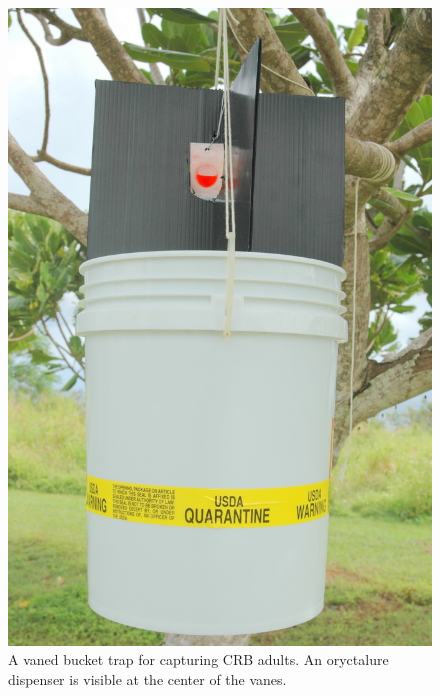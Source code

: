\documentclass[twocolumn,letterpaper]{scrartcl}
\begin{document}
\begin{figure}[h]
	\centering
	\includegraphics[width=0.7\linewidth]{images/uog-bucket}
	\caption{A vaned bucket trap for capturing CRB adults. An oryctalure dispenser is visible at the center of the vanes.}
	\label{fig:uog-bucket}
\end{figure}
\end{document}
